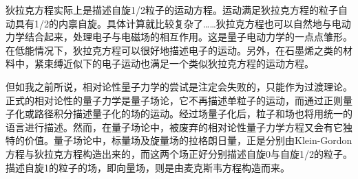 \documentclass{ctexart}
\begin{document}
狄拉克方程实际上是描述自旋1/2粒子的运动方程。运动满足狄拉克方程的粒子自动具有1/2的内禀自旋。具体计算就比较复杂了……狄拉克方程也可以自然地与电动力学结合起来，处理电子与电磁场的相互作用。这是量子电动力学的一点点雏形。在低能情况下，狄拉克方程可以很好地描述电子的运动。另外，在石墨烯之类的材料中，紧束缚近似下的电子运动也满足一个类似狄拉克方程的运动方程。

但如我之前所说，相对论性量子力学的尝试是注定会失败的，只能作为过渡理论。正式的相对论性的量子力学是量子场论，它不再描述单粒子的运动，而通过正则量子化或路径积分描述量子化的场的运动。经过场量子化后，粒子和场也将用统一的语言进行描述。然而，在量子场论中，被废弃的相对论性量子力学方程又会有它独特的价值。量子场论中，标量场及旋量场的拉格朗日量，正是分别由Klein-Gordon方程与狄拉克方程构造出来的，而这两个场正好分别描述自旋0与自旋1/2的粒子。描述自旋1的粒子的场，即向量场，则是由麦克斯韦方程构造而来。
\end{document}
